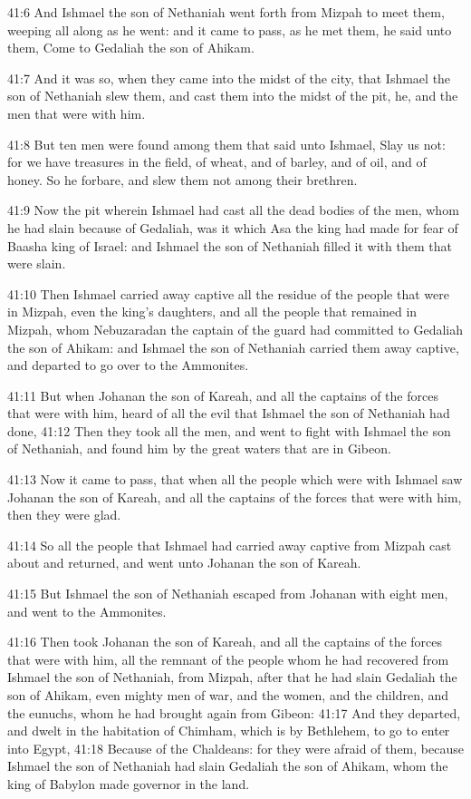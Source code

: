 41:6 And Ishmael the son of Nethaniah went forth from Mizpah to meet them, weeping all along as he went: and it came to pass, as he met them, he said unto them, Come to Gedaliah the son of Ahikam.

41:7 And it was so, when they came into the midst of the city, that Ishmael the son of Nethaniah slew them, and cast them into the midst of the pit, he, and the men that were with him.

41:8 But ten men were found among them that said unto Ishmael, Slay us not: for we have treasures in the field, of wheat, and of barley, and of oil, and of honey. So he forbare, and slew them not among their brethren.

41:9 Now the pit wherein Ishmael had cast all the dead bodies of the men, whom he had slain because of Gedaliah, was it which Asa the king had made for fear of Baasha king of Israel: and Ishmael the son of Nethaniah filled it with them that were slain.

41:10 Then Ishmael carried away captive all the residue of the people that were in Mizpah, even the king's daughters, and all the people that remained in Mizpah, whom Nebuzaradan the captain of the guard had committed to Gedaliah the son of Ahikam: and Ishmael the son of Nethaniah carried them away captive, and departed to go over to the Ammonites.

41:11 But when Johanan the son of Kareah, and all the captains of the forces that were with him, heard of all the evil that Ishmael the son of Nethaniah had done, 41:12 Then they took all the men, and went to fight with Ishmael the son of Nethaniah, and found him by the great waters that are in Gibeon.

41:13 Now it came to pass, that when all the people which were with Ishmael saw Johanan the son of Kareah, and all the captains of the forces that were with him, then they were glad.

41:14 So all the people that Ishmael had carried away captive from Mizpah cast about and returned, and went unto Johanan the son of Kareah.

41:15 But Ishmael the son of Nethaniah escaped from Johanan with eight men, and went to the Ammonites.

41:16 Then took Johanan the son of Kareah, and all the captains of the forces that were with him, all the remnant of the people whom he had recovered from Ishmael the son of Nethaniah, from Mizpah, after that he had slain Gedaliah the son of Ahikam, even mighty men of war, and the women, and the children, and the eunuchs, whom he had brought again from Gibeon: 41:17 And they departed, and dwelt in the habitation of Chimham, which is by Bethlehem, to go to enter into Egypt, 41:18 Because of the Chaldeans: for they were afraid of them, because Ishmael the son of Nethaniah had slain Gedaliah the son of Ahikam, whom the king of Babylon made governor in the land.

